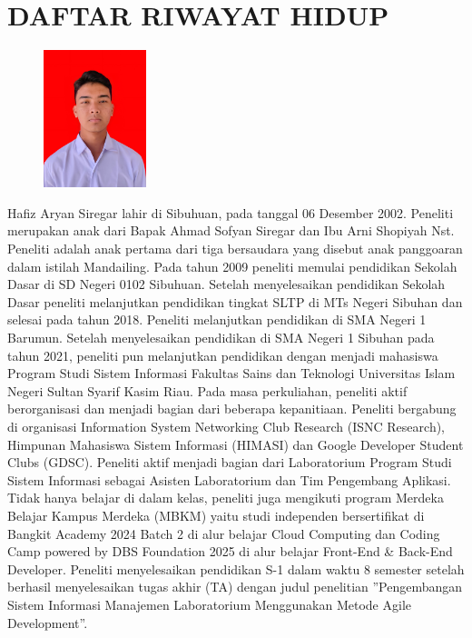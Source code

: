 %
%
%
%

\chapter*{DAFTAR RIWAYAT HIDUP}
\pagestyle{empty}

\noindent
\begin{figure}
	\includegraphics[width=3cm, height=4cm]{konten/gambar/fotoprofil.jpg}
\end{figure}
Hafiz Aryan Siregar lahir di Sibuhuan, pada tanggal 06 Desember 2002. Peneliti merupakan anak dari Bapak Ahmad Sofyan Siregar dan Ibu Arni Shopiyah Nst. Peneliti adalah anak pertama dari tiga bersaudara yang disebut anak panggoaran dalam istilah Mandailing. Pada tahun 2009 peneliti memulai pendidikan Sekolah Dasar di SD Negeri 0102 Sibuhuan. Setelah menyelesaikan pendidikan Sekolah Dasar peneliti melanjutkan pendidikan tingkat SLTP di MTs Negeri Sibuhan dan selesai pada tahun 2018. Peneliti melanjutkan pendidikan di SMA Negeri 1 Barumun. Setelah menyelesaikan pendidikan di SMA Negeri 1 Sibuhan pada tahun 2021, peneliti pun melanjutkan pendidikan dengan menjadi mahasiswa Program Studi Sistem Informasi Fakultas Sains dan Teknologi Universitas Islam Negeri Sultan Syarif Kasim Riau. Pada masa perkuliahan, peneliti aktif berorganisasi dan menjadi bagian dari beberapa kepanitiaan. Peneliti bergabung di organisasi Information System Networking Club Research (ISNC Research), Himpunan Mahasiswa Sistem Informasi (HIMASI) dan Google Developer Student Clubs (GDSC). Peneliti aktif menjadi bagian dari Laboratorium Program Studi Sistem Informasi sebagai Asisten Laboratorium dan Tim Pengembang Aplikasi. Tidak hanya belajar di dalam kelas, peneliti juga mengikuti program Merdeka Belajar Kampus Merdeka (MBKM) yaitu studi independen bersertifikat di Bangkit Academy 2024 Batch 2 di alur belajar Cloud Computing dan Coding Camp powered by DBS Foundation 2025 di alur belajar Front-End \& Back-End Developer. Peneliti menyelesaikan pendidikan S-1 dalam waktu 8 semester setelah berhasil menyelesaikan tugas akhir (TA) dengan judul penelitian ”Pengembangan Sistem Informasi Manajemen Laboratorium Menggunakan Metode Agile Development”.